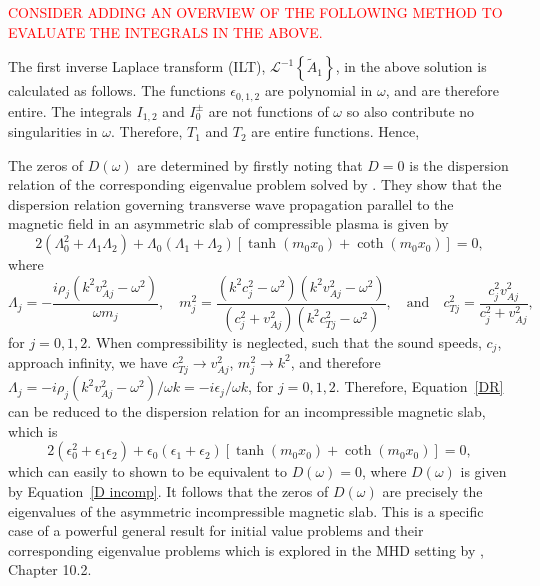 \documentclass{aastex61}
\begin{document}
\textcolor{red}{CONSIDER ADDING AN OVERVIEW OF THE FOLLOWING METHOD TO EVALUATE THE INTEGRALS IN THE ABOVE.}

The first inverse Laplace transform (ILT), $\mathcal{L}^{-1}\left\{ \tilde{A}_1 \right\}$, in the above solution is calculated as follows. The functions $\epsilon_{0,1,2}$ are polynomial in $\omega$, and are therefore entire. The integrals $I_{1,2}$ and $I_0^\pm$ are not functions of $\omega$ so also contribute no singularities in $\omega$. Therefore, $T_1$ and $T_2$ are entire functions. Hence, 

The zeros of $D(\omega)$ are determined by firstly noting that $D=0$ is the dispersion relation of the corresponding eigenvalue problem solved by \cite{zsa_etal18}. They show that the dispersion relation governing transverse wave propagation parallel to the magnetic field in an asymmetric slab of compressible plasma is given by
\begin{equation}
2(\Lambda_0^2 + \Lambda_1 \Lambda_2) + \Lambda_0(\Lambda_1 + \Lambda_2)[\tanh(m_0x_0) + \coth(m_0x_0)] = 0,
\label{DR}
\end{equation}
where
\begin{equation}
\Lambda_j = -\frac{i\rho_j(k^2v_{Aj}^2 - \omega^2)}{\omega m_j},
\quad
m_j^2 = \frac{(k^2c_j^2 - \omega^2)(k^2v_{Aj}^2 - \omega^2)}{(c_j^2 + v_{Aj}^2)(k^2c_{Tj}^2 - \omega^2)},
\quad
\text{and}
\quad
c_{Tj}^2 = \frac{c_j^2v_{Aj}^2}{c_j^2 + v_{Aj}^2},
\end{equation}
for $j = 0, 1, 2$. When compressibility is neglected, such that the sound speeds, $c_j$, approach infinity, we have $c_{Tj}^2 \to v_{Aj}^2$, $m_j^2 \to k^2$, and therefore $\Lambda_j = -i\rho_j(k^2v_{Aj}^2 - \omega^2)/\omega k = -i\epsilon_j / \omega k$, for $j=0,1,2$. Therefore, Equation~\eqref{DR} can be reduced to the dispersion relation for an incompressible magnetic slab, which is
\begin{equation}
2(\epsilon_0^2 + \epsilon_1 \epsilon_2) + \epsilon_0(\epsilon_1 + \epsilon_2)[\tanh(m_0x_0) + \coth(m_0x_0)] = 0,
\end{equation}
which can easily to shown to be equivalent to $D(\omega) = 0$, where $D(\omega)$ is given by Equation~\eqref{D incomp}. It follows that the zeros of $D(\omega)$ are precisely the eigenvalues of the asymmetric incompressible magnetic slab. This is a specific case of a powerful general result for initial value problems and their corresponding eigenvalue problems which is explored in the MHD setting by \cite{goe_etal04}, Chapter 10.2.
\end{document}
